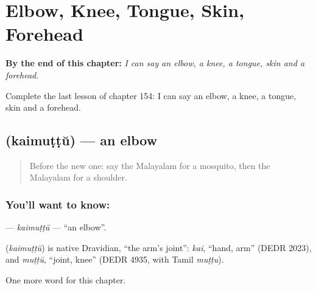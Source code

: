 
\chapter{Elbow, Knee, Tongue, Skin, Forehead}
\label{ch:ml-elbow-knee-tongue-skin-forehead}

\begin{chapteropening}
\textbf{By the end of this chapter:} \emph{I can say an elbow, a knee, a tongue, skin and a forehead.}

Complete the last lesson of chapter 154: I can say an elbow, a knee, a tongue, skin and a forehead.
\end{chapteropening}

\section[\texorpdfstring{\ml{കൈമുട്ട്} (kaimuṭṭŭ)}{കൈമുട്ട് (kaimuṭṭŭ)}]{ (kaimuṭṭŭ) — an elbow}

\label{lesson:ML-C154-kaimuttu}



\begin{quote}
Before the new one: say the Malayalam for a mosquito, then the Malayalam for a shoulder.
\end{quote}

\subsection*{You'll want to know: }
\textbf{} — \emph{kaimuṭṭŭ} — \textquotedblleft{}an elbow\textquotedblright{}.

\begin{cousinweb}
\textbf{} (\emph{kaimuṭṭŭ}) is native Dravidian, \textquotedblleft{}the arm's joint\textquotedblright{}: \emph{kai}, \textquotedblleft{}hand, arm\textquotedblright{} (DEDR 2023), and \emph{muṭṭŭ}, \textquotedblleft{}joint, knee\textquotedblright{} (DEDR 4935, with Tamil \emph{muṭṭu}).
\end{cousinweb}

\begin{grammarlens}[title={What you've built}]
One more word for this chapter.
\end{grammarlens}

